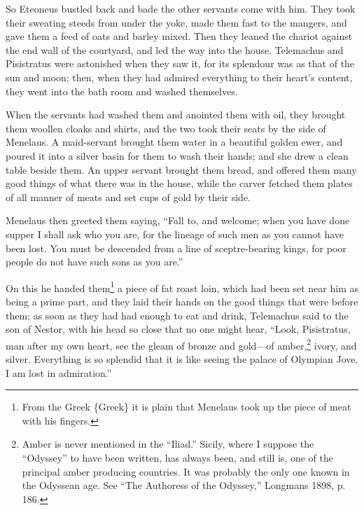 So Eteoneus bustled back and bade the other servants come with him. They took
their sweating steeds from under the yoke, made them fast to the mangers, and
gave them a feed of oats and barley mixed. Then they leaned the chariot against
the end wall of the courtyard, and led the way into the house. Telemachus and
Pisistratus were astonished when they saw it, for its splendour was as that of
the sun and moon; then, when they had admired everything to their heart’s
content, they went into the bath room and washed themselves.

When the servants had washed them and anointed them with oil, they brought them
woollen cloaks and shirts, and the two took their seats by the side of
Menelaus. A maid-servant brought them water in a beautiful golden ewer, and
poured it into a silver basin for them to wash their hands; and she drew a
clean table beside them. An upper servant brought them bread, and offered them
many good things of what there was in the house, while the carver fetched them
plates of all manner of meats and set cups of gold by their side.

Menelaus then greeted them saying, “Fall to, and welcome; when you have done
supper I shall ask who you are, for the lineage of such men as you cannot have
been lost. You must be descended from a line of sceptre-bearing kings, for poor
people do not have such sons as you are.”

On this he handed them\footnote{From the Greek \{Greek\} it is plain that Menelaus took up the piece of meat
with his fingers.} a piece of fat roast loin, which had
been set near him as being a prime part, and they laid their hands on the good
things that were before them; as soon as they had had enough to eat and drink,
Telemachus said to the son of Nestor, with his head so close that no one might
hear, “Look, Pisistratus, man after my own heart, see the gleam of bronze and
gold—of amber,\footnote{Amber is never mentioned in the “Iliad.” Sicily, where I suppose the
“Odyssey” to have been written, has always been, and still is, one of the
principal amber producing countries. It was probably the only one known in the
Odyssean age. See “The Authoress of the Odyssey,” Longmans 1898, p. 186.}
ivory, and silver. Everything is so splendid that it is like seeing the palace
of Olympian Jove. I am lost in admiration.”

